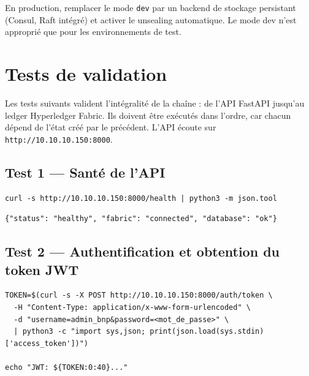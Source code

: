 \documentclass[12pt,a4paper,french]{article}
\begin{document}
\begin{alertbox}
En production, remplacer le mode \texttt{dev} par un backend de stockage persistant
(Consul, Raft intégré) et activer le unsealing automatique. Le mode dev n'est
approprié que pour les environnements de test.
\end{alertbox}

\section{Tests de validation}

\begin{infobox}
Les tests suivants valident l'intégralité de la chaîne : de l'API FastAPI jusqu'au
ledger Hyperledger Fabric. Ils doivent être exécutés dans l'ordre, car chacun dépend
de l'état créé par le précédent. L'API écoute sur \texttt{http://10.10.10.150:8000}.
\end{infobox}

\subsection{Test 1 — Santé de l'API}

\begin{lstlisting}[style=bash]
curl -s http://10.10.10.150:8000/health | python3 -m json.tool
\end{lstlisting}

\begin{successbox}
\begin{verbatim}
{"status": "healthy", "fabric": "connected", "database": "ok"}
\end{verbatim}
\end{successbox}

\subsection{Test 2 — Authentification et obtention du token JWT}

\begin{lstlisting}[style=bash]
TOKEN=$(curl -s -X POST http://10.10.10.150:8000/auth/token \
  -H "Content-Type: application/x-www-form-urlencoded" \
  -d "username=admin_bnp&password=<mot_de_passe>" \
  | python3 -c "import sys,json; print(json.load(sys.stdin)['access_token'])")

echo "JWT: ${TOKEN:0:40}..."
\end{lstlisting}
\end{document}
